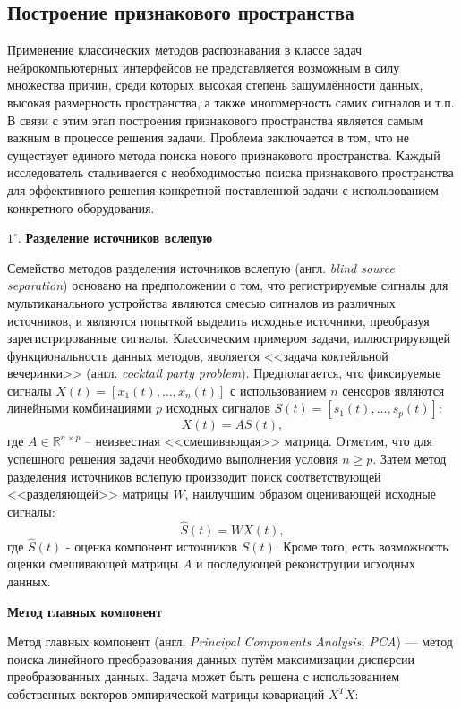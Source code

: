 \documentclass[12pt,fleqn]{article}
\begin{document}
	\subsection{Построение признакового пространства}
	\par Применение классических методов распознавания в классе задач нейрокомпьютерных интерфейсов не представляется возможным в силу множества причин, среди которых высокая степень зашумлённости данных, высокая размерность пространства, а также многомерность самих сигналов и т.п. В связи с этим этап построения признакового пространства является самым важным в процессе решения задачи. Проблема заключается в том, что не существует единого метода поиска нового признакового пространства. Каждый исследователь сталкивается с необходимостью поиска признакового пространства для эффективного решения конкретной поставленной задачи с использованием конкретного оборудования. 
	\par $1^{\circ}.$ {\bf Разделение источников вслепую}
	\par Семейство методов разделения источников вслепую (англ. {\it blind source separation}) основано на предположении о том, что регистрируемые сигналы для мультиканального устройства являются смесью сигналов из различных источников, и являются попыткой выделить исходные источники, преобразуя зарегистрированные сигналы. Классическим примером задачи, иллюстрирующей функциональность данных методов, яволяется <<задача коктейльной вечеринки>> (англ. {\it cocktail party problem}). Предполагается, что фиксируемые сигналы $X(t) = [x_1(t), \dots, x_n(t)]$ с использованием $n$ сенсоров являются линейными комбинациями $p$ исходных сигналов $S(t) = [s_1(t), \dots, s_p(t)]$:
$$X(t) = AS(t),$$
	где $A \in \mathbb{R}^{n \times p}$ -- неизвестная <<смешивающая>> матрица. Отметим, что для успешного решения задачи необходимо выполнения условия $n \ge p.$ Затем метод разделения источников вслепую производит поиск соответствующей <<разделяющей>> матрицы $W$, наилучшим образом оценивающей исходные сигналы:
$$\hat{S}(t) = WX(t),$$
	где $\hat{S}(t)$ - оценка компонент источников $S(t)$. Кроме того, есть возможность оценки смешивающей матрицы $A$ и последующей реконструции исходных данных.
	\par {\bf Метод главных компонент}
	\par Метод главных компонент (англ. {\it Principal Components Analysis, PCA}) — метод поиска линейного преобразования данных путём максимизации дисперсии преобразованных данных. Задача может быть решена с использованием собственных векторов эмпирической матрицы ковариаций $X^TX$:
\end{document}
